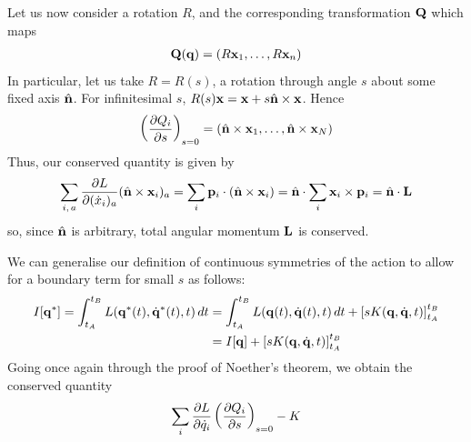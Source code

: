 \documentclass{../template/note}
\begin{document}
    \begin{example*}
        Let us now consider a rotation $R$, and the corresponding transformation $\V Q$ which maps
        \begin{align*}
            \V Q(\V q) = (R \V x_1, \dots, R \V x_n)
        \end{align*}
        In particular, let us take $R = R(s)$, a rotation through angle $s$ about some fixed axis $\hvec n$. For infinitesimal $s$, $R(s) \V x = \V x + s \hvec n \times \V x$. Hence
        \begin{align*}
            \left(\pd{Q_i}{s}\right)_{s=0} = (\hvec n \times \V x_1, \dots, \hvec n \times \V x_N)
        \end{align*}
        Thus, our conserved quantity is given by
        \begin{align*}
            \sum_{i,\, a} \pd{L}{(\dot x_i)_a} (\hvec n \times \V x_i)_a = \sum_i \V p_i \cdot (\hvec n \times \V x_i) = \hvec n \cdot \sum_i \V x_i \times \V p_i = \hvec n \cdot \V L
        \end{align*}
        so, since $\hvec n$ is arbitrary, total angular momentum $\V L$ is conserved.       
    \end{example*}
    
    We can generalise our definition of continuous symmetries of the action to allow for a boundary term for small $s$ as follows:
    \begin{align*}
        I[\V q^*] = \int_{t_A}^{t_B} L(\V q^*(t), \dot{\V q}^*(t), t) \D t &= \int_{t_A}^{t_B} L(\V q(t), \dot{\V q}(t), t) \D t + \left[sK(\V q, \dot{\V q}, t)\right]_{t_A}^{t_B} \\
        &= I[\V q] + \left[sK(\V q, \dot{\V q}, t)\right]_{t_A}^{t_B}
    \end{align*}
    Going once again through the proof of Noether's theorem, we obtain the conserved quantity
    \begin{align*}
        \sum_i \pd{L}{\dot q_i} \left(\pd{Q_i}{s}\right)_{s=0}-K
    \end{align*}
    
\end{document}
